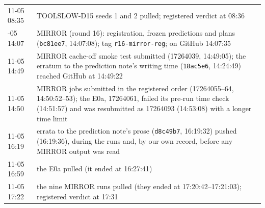 \begin{table}[tbp]
\begin{tabular}{@{}p{2.3cm} >{\raggedright\arraybackslash}p{14.4cm}@{}}
11-05 08:35 & TOOLSLOW-D15 seeds 1 and 2 pulled; registered verdict at 08:36\\
\addlinespace
11-05 14:07 & MIRROR (round 16): registration, frozen predictions and plans (\texttt{bc81ee7}, 14:07:08); tag \texttt{r16-mirror-reg}; on GitHub 14:07:35\\
11-05 14:49 & MIRROR cache-off smoke test submitted (17264039, 14:49:05); the erratum to the prediction note's writing time (\texttt{18ac5e6}, 14:24:49) reached GitHub at 14:49:22\\
11-05 14:50 & MIRROR jobs submitted in the registered order (17264055--64, 14:50:52--53); the E0a, 17264061, failed its pre-run time check (14:51:57) and was resubmitted as 17264093 (14:53:08) with a longer time limit\\
11-05 16:19 & errata to the prediction note's prose (\texttt{d8c49b7}, 16:19:32) pushed (16:19:36), during the runs and, by our own record, before any MIRROR output was read\\
11-05 16:59 & the E0a pulled (it ended at 16:27:41)\\
11-05 17:22 & the nine MIRROR runs pulled (they ended at 17:20:42--17:21:03); registered verdict at 17:31\\
\bottomrule
\end{tabular}
\end{table}

